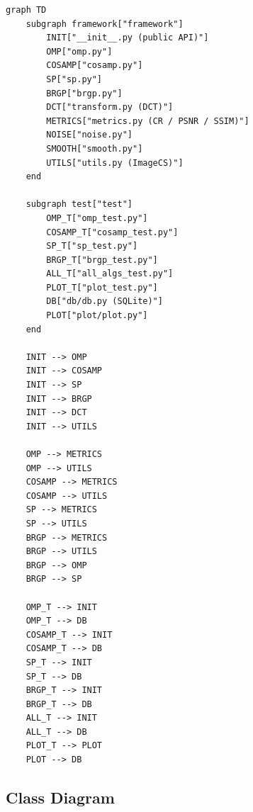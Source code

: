 \documentclass[12pt,a4paper]{article}
\begin{document}
\begin{lstlisting}[style=mermaid,caption={Module dependency graph (Mermaid source)}]
graph TD
    subgraph framework["framework"]
        INIT["__init__.py (public API)"]
        OMP["omp.py"]
        COSAMP["cosamp.py"]
        SP["sp.py"]
        BRGP["brgp.py"]
        DCT["transform.py (DCT)"]
        METRICS["metrics.py (CR / PSNR / SSIM)"]
        NOISE["noise.py"]
        SMOOTH["smooth.py"]
        UTILS["utils.py (ImageCS)"]
    end

    subgraph test["test"]
        OMP_T["omp_test.py"]
        COSAMP_T["cosamp_test.py"]
        SP_T["sp_test.py"]
        BRGP_T["brgp_test.py"]
        ALL_T["all_algs_test.py"]
        PLOT_T["plot_test.py"]
        DB["db/db.py (SQLite)"]
        PLOT["plot/plot.py"]
    end

    INIT --> OMP
    INIT --> COSAMP
    INIT --> SP
    INIT --> BRGP
    INIT --> DCT
    INIT --> UTILS

    OMP --> METRICS
    OMP --> UTILS
    COSAMP --> METRICS
    COSAMP --> UTILS
    SP --> METRICS
    SP --> UTILS
    BRGP --> METRICS
    BRGP --> UTILS
    BRGP --> OMP
    BRGP --> SP

    OMP_T --> INIT
    OMP_T --> DB
    COSAMP_T --> INIT
    COSAMP_T --> DB
    SP_T --> INIT
    SP_T --> DB
    BRGP_T --> INIT
    BRGP_T --> DB
    ALL_T --> INIT
    ALL_T --> DB
    PLOT_T --> PLOT
    PLOT --> DB
\end{lstlisting}

\subsection{Class Diagram}
\end{document}
